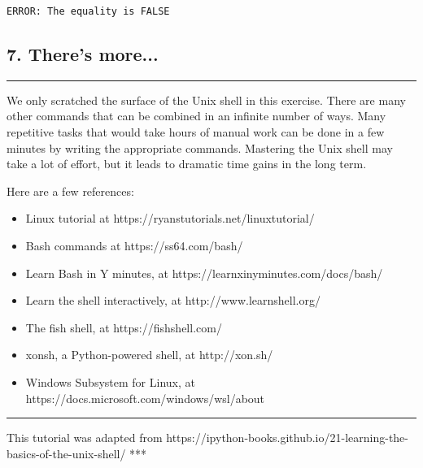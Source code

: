 \documentclass[11pt]{article}
\providecommand{\tightlist}{%
      \setlength{\itemsep}{0pt}\setlength{\parskip}{0pt}}
\begin{document}
    \begin{Verbatim}[commandchars=\\\{\}]
ERROR: The equality is FALSE

    \end{Verbatim}

    \subsection{7. There's more...}\label{theres-more...}

\begin{center}\rule{0.5\linewidth}{\linethickness}\end{center}

We only scratched the surface of the Unix shell in this exercise. There
are many other commands that can be combined in an infinite number of
ways. Many repetitive tasks that would take hours of manual work can be
done in a few minutes by writing the appropriate commands. Mastering the
Unix shell may take a lot of effort, but it leads to dramatic time gains
in the long term.

Here are a few references:

\begin{itemize}
\tightlist
\item
  Linux tutorial at https://ryanstutorials.net/linuxtutorial/
\item
  Bash commands at https://ss64.com/bash/
\item
  Learn Bash in Y minutes, at https://learnxinyminutes.com/docs/bash/
\item
  Learn the shell interactively, at http://www.learnshell.org/
\item
  The fish shell, at https://fishshell.com/
\item
  xonsh, a Python-powered shell, at http://xon.sh/
\item
  Windows Subsystem for Linux, at
  https://docs.microsoft.com/windows/wsl/about
\end{itemize}

    \begin{center}\rule{0.5\linewidth}{\linethickness}\end{center}

This tutorial was adapted from
https://ipython-books.github.io/21-learning-the-basics-of-the-unix-shell/
***


    
    
    
    
\end{document}
